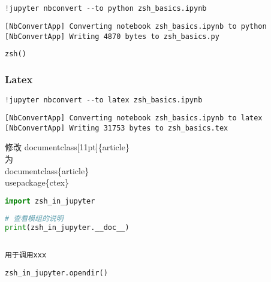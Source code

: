 \documentclass[
]{article}
\begin{document}
\hypertarget{56272e70}{}
\begin{lstlisting}[language=Python]
!jupyter nbconvert --to python zsh_basics.ipynb
\end{lstlisting}

\begin{lstlisting}
[NbConvertApp] Converting notebook zsh_basics.ipynb to python
[NbConvertApp] Writing 4870 bytes to zsh_basics.py
\end{lstlisting}

\hypertarget{09bc2ee6}{}
\begin{lstlisting}[language=Python]
zsh()
\end{lstlisting}

\hypertarget{bad748bc}{}
\hypertarget{latex}{%
\subsubsection{Latex}\label{latex}}

\hypertarget{b9528858}{}
\begin{lstlisting}[language=Python]
!jupyter nbconvert --to latex zsh_basics.ipynb
\end{lstlisting}

\begin{lstlisting}
[NbConvertApp] Converting notebook zsh_basics.ipynb to latex
[NbConvertApp] Writing 31753 bytes to zsh_basics.tex
\end{lstlisting}

\leavevmode{}%
修改 documentclass{[}11pt{]}\{article\}\\
为\\
documentclass\{article\}\\
usepackage\{ctex\}

\hypertarget{1c7d164c}{}
\begin{lstlisting}[language=Python]
import zsh_in_jupyter
\end{lstlisting}

\hypertarget{6567a6f4}{}
\begin{lstlisting}[language=Python]
# 查看模组的说明
print(zsh_in_jupyter.__doc__)
\end{lstlisting}

\begin{lstlisting}

用于调用xxx

\end{lstlisting}

\hypertarget{8400b0b0}{}
\begin{lstlisting}[language=Python]
zsh_in_jupyter.opendir()
\end{lstlisting}
\end{document}
